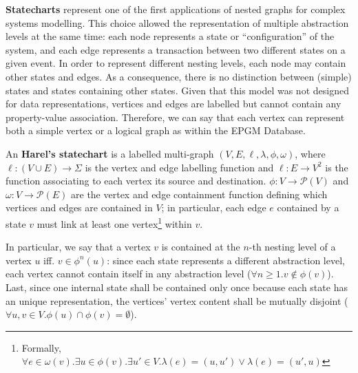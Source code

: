 
\textbf{Statecharts} \cite{statecharts} represent one of the first applications of nested graphs for complex systems modelling. This choice allowed the representation of multiple abstraction levels at the same time: each node represents a  state or ``configuration'' of the system, and each edge represents a transaction between two different states on a given event. In order to represent different nesting levels, each node may contain other states and edges. As a consequence,  there is no distinction between (simple) states and states containing other states. Given that this model was not designed for data representations, vertices and edges are labelled but cannot contain any property-value association. Therefore, we can say that each vertex can represent both a simple vertex or a logical graph as within the EPGM Database. 

%

\begin{definition}
An \textbf{Harel's statechart}  is a labelled multi-graph $(V,E,\ell,\lambda,\phi,\omega)$, where $\ell\colon(V\cup E)\to  \Sigma$ is the vertex and edge labelling function and $\ell\colon E\to V^2$ is the function associating to each vertex its source and destination. $\phi\colon V \to\mathcal{P}(V)$ and $\omega\colon V \to\mathcal{P}(E)$ are the vertex and edge containment function defining which vertices and edges are contained in $V$; in particular, each edge $e$ contained by a state $v$ must link at least one vertex\footnote{Formally, $\forall e\in \omega(v).\exists u\in \phi(v).\exists u'\in V. \lambda(e)=(u,u')\vee \lambda(e)=(u',u)$} within $v$.

In particular, we say that a vertex $v$ is contained at the $n$-th nesting level of a vertex $u$ iff. $v\in \phi^n(u)$: since each state represents a different abstraction level, each vertex cannot contain itself in any abstraction level ($\forall n\geq 1. v\notin \phi(v)$).
Last, since one internal state shall be contained only once because each state has an unique representation, the vertices' vertex content shall be mutually disjoint ($\forall u,v\in V. \phi(u)\cap \phi(v)=\emptyset$).
\end{definition} 

